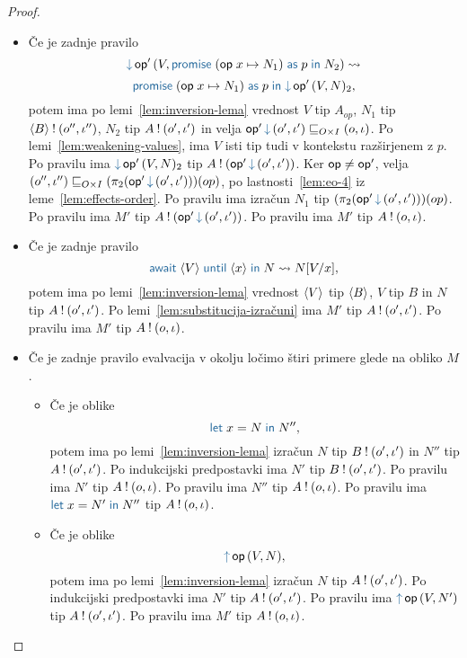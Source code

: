 \begin{proof}
\begin{itemize}
		\item Če je zadnje pravilo $$\tmopin{op'}{V}{\tmwith{op}{x}{N_1}{p}{N_2}} \reduces$$ $$ \tmwith{op}{x}{N_1}{p}{\tmopin{op'}{V}{N}_2},$$ potem ima po lemi~\ref{lem:inversion-lema} vrednost $V$ tip $A_{op}$, $N_1$ tip $\langle B \rangle \mathbin{!} (o'', \iota'')$, $N_2$ tip $A \mathbin{!} (o', \iota')$ in velja $\opincomp{op'}{(\o', \i')} \order{O \times I} (\o, \i)$.
		Po lemi~\ref{lem:weakening-values}, ima $V$ isti tip tudi v kontekstu razširjenem z $p$.
		Po pravilu  ima $\tmopin{op'}{V}{N}_2$ tip $\tycomp{A}{\opincomp{op'}{(\o', \i')}}$.
		Ker $\mathsf{op} \neq \mathsf{op}'$, velja $(\o'', \i'') \order{O \times I} (\pi_2(\opincomp{op'}{(\o', \i')}))(op)$, po lastnosti~\ref{lem:eo-4} iz leme~\ref{lem:effects-order}. Po pravilu  ima izračun $N_1$ tip $(\pi_2(\opincomp{op'}{(\o', \i')}))(op)$.
		Po pravilu  ima $M'$ tip $\tycomp{A}{\opincomp{op'}{(\o', \i')}}$.
		Po pravilu  ima $M'$ tip $A \mathbin{!} (o, \iota)$.
		
		\item Če je zadnje pravilo $$\tmawait{\tmpromise V}{x}{N} \reduces N[V/x],$$ potem ima po lemi~\ref{lem:inversion-lema} vrednost $\langle V \rangle$ tip $\langle B \rangle$, $V$ tip $B$ in $N$ tip $A \mathbin{!} (o', \iota')$.
		Po lemi~\ref{lem:substitucija-izračuni} ima $M'$ tip $A \mathbin{!} (o', \iota')$.
		Po pravilu  ima $M'$ tip $A \mathbin{!} (o, \iota)$.
		
		\item Če je zadnje pravilo evalvacija v okolju ločimo štiri primere glede na obliko $M$.
		\begin{itemize}
			\item Če je oblike $$\tmlet{x}{N}{N''},$$ potem ima po lemi~\ref{lem:inversion-lema} izračun $N$ tip $B \mathbin{!} (o', \iota')$ in $N''$ tip $A \mathbin{!} (o', \iota')$.
			Po indukcijski predpostavki ima $N'$ tip $B \mathbin{!} (o', \iota')$.
			Po pravilu  ima $N'$ tip $A \mathbin{!} (o, \iota)$.
			Po pravilu  ima $N''$ tip $A \mathbin{!} (o, \iota)$.
			Po pravilu  ima $\tmlet{x}{N'}{N''}$ tip $A \mathbin{!} (o, \iota)$.
			
			\item Če je oblike $$\tmopout{op}{V}{N},$$ potem ima po lemi~\ref{lem:inversion-lema} izračun $N$ tip $A \mathbin{!} (o', \iota')$.
			Po indukcijski predpostavki ima $N'$ tip $A \mathbin{!} (o', \iota')$.
			Po pravilu  ima $\tmopout{op}{V}{N'}$ tip $A \mathbin{!} (o', \iota')$.
			Po pravilu  ima $M'$ tip $A \mathbin{!} (o, \iota)$.
			

\end{itemize}
\end{itemize}
\end{proof}
